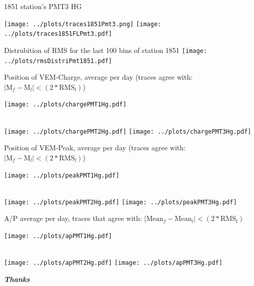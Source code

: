 \documentclass[aspectratio=169]{beamer}
\begin{document}
\begin{frame}
	1851 station's PMT3 HG

  \centering
	\texttt{[image: ../plots/traces1851Pmt3.png]}
	\texttt{[image: ../plots/traces1851FLPmt3.pdf]}
\end{frame}


\begin{frame}
	Distrubition of RMS for the last 100 bins of station 1851
	\centering
	\texttt{[image: ../plots/rmsDistriPmt1851.pdf]}
\end{frame}


\begin{frame}
	Position of VEM-Charge, average per day (traces agree with: $\mid \mathrm{M}_f - \mathrm{M}_l \mid < \left( 2*\mathrm{RMS_f} \right) $)

  \centering
	\texttt{[image: ../plots/chargePMT1Hg.pdf]}\quad%
	\begin{minipage}[b][0.4\textheight][c]
		{.45\linewidth}
	\end{minipage}\\[1em]
	\texttt{[image: ../plots/chargePMT2Hg.pdf]}\quad%
	\texttt{[image: ../plots/chargePMT3Hg.pdf]}
\end{frame}


\begin{frame}
	Position of VEM-Peak, average per day (traces agree with: $\mid \mathrm{M}_f - \mathrm{M}_l \mid < \left( 2*\mathrm{RMS_f} \right) $)

  \centering
	\texttt{[image: ../plots/peakPMT1Hg.pdf]}\quad%
	\begin{minipage}[b][0.4\textheight][c]
		{.45\linewidth}
	\end{minipage}\\[1em]
	\texttt{[image: ../plots/peakPMT2Hg.pdf]}\quad%
	\texttt{[image: ../plots/peakPMT3Hg.pdf]}
\end{frame}


\begin{frame}
	A/P average per day, traces that agree with: $\mid \mathrm{Mean}_f - \mathrm{Mean}_l \mid < \left( 2*\mathrm{RMS_f} \right) $

  \centering
	\texttt{[image: ../plots/apPMT1Hg.pdf]}%
	\begin{minipage}[b][0.2\textheight][c]
		{.15\linewidth}
	\end{minipage}\\[1em]
	\texttt{[image: ../plots/apPMT2Hg.pdf]}\quad%
	\texttt{[image: ../plots/apPMT3Hg.pdf]}
\end{frame}


\begin{frame}
  \centering
	{\Huge\bf\it Thanks}
\end{frame}
\end{document}
